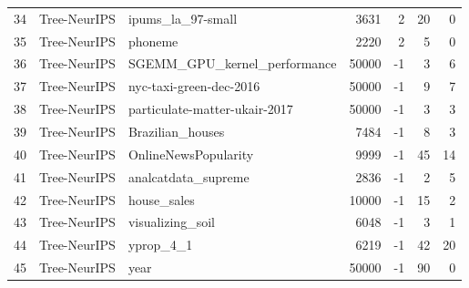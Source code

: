 \begin{table}[]
{\begin{tabular}{rllrrrr}
34                     & Tree-NeurIPS & ipums\_la\_97-small                              & 3631                    & 2                       & 20                      & 0                       \\
35                     & Tree-NeurIPS & phoneme                                          & 2220                    & 2                       & 5                       & 0                       \\
36                     & Tree-NeurIPS & SGEMM\_GPU\_kernel\_performance                  & 50000                   & -1                      & 3                       & 6                       \\
37                     & Tree-NeurIPS & nyc-taxi-green-dec-2016                          & 50000                   & -1                      & 9                       & 7                       \\
38                     & Tree-NeurIPS & particulate-matter-ukair-2017                    & 50000                   & -1                      & 3                       & 3                       \\
39                     & Tree-NeurIPS & Brazilian\_houses                                & 7484                    & -1                      & 8                       & 3                       \\
40                     & Tree-NeurIPS & OnlineNewsPopularity                             & 9999                    & -1                      & 45                      & 14                      \\
41                     & Tree-NeurIPS & analcatdata\_supreme                             & 2836                    & -1                      & 2                       & 5                       \\
42                     & Tree-NeurIPS & house\_sales                                     & 10000                   & -1                      & 15                      & 2                       \\
43                     & Tree-NeurIPS & visualizing\_soil                                & 6048                    & -1                      & 3                       & 1                       \\
44                     & Tree-NeurIPS & yprop\_4\_1                                      & 6219                    & -1                      & 42                      & 20                      \\
45                     & Tree-NeurIPS & year                                             & 50000                   & -1                      & 90                      & 0                       \\

\end{tabular}}
\end{table}
